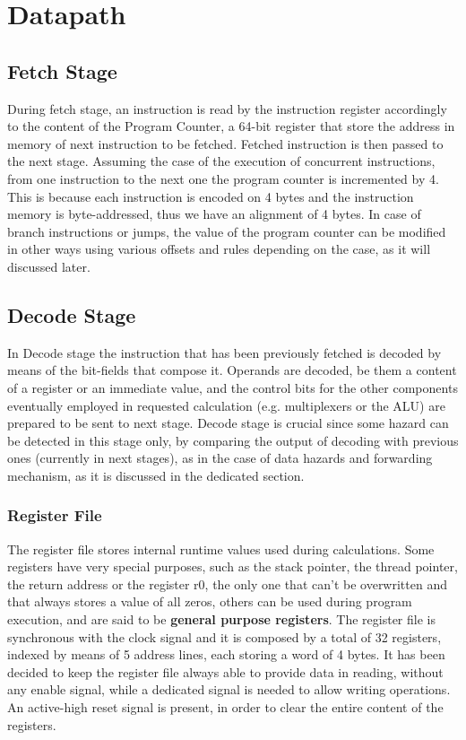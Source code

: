 %
 
\chapter{Datapath}
\label{cha2}
\section{Fetch Stage}
During fetch stage, an instruction is read by the instruction register accordingly to the content of the Program Counter, a 64-bit register that store the address in memory of next instruction to be fetched.
Fetched instruction is then passed to the next stage.
Assuming the case of the execution of concurrent instructions, from one instruction to the next one the program counter is incremented by 4. This is because each instruction is encoded on 4 bytes and the instruction memory is byte-addressed, thus we have an alignment of 4 bytes.
In case of branch instructions or jumps, the value of the program counter can be modified in other ways using various offsets and rules depending on the case, as it will discussed later.
\section{Decode Stage}
In Decode stage the instruction that has been previously fetched is decoded by means of the bit-fields that compose it.
Operands are decoded, be them a content of a register or an immediate value, and the control bits for the other components eventually employed in requested calculation (e.g. multiplexers or the ALU) are prepared to be sent to next stage.
Decode stage is crucial since some hazard can be detected in this stage only, by comparing the output of decoding with previous ones (currently in next stages), as in the case of data hazards and forwarding mechanism, as it is discussed in the dedicated section.
\subsection{Register File}
The register file stores internal runtime values used during calculations.
Some registers have very special purposes, such as the stack pointer, the thread pointer, the return address or the register r0, the only one that can't be overwritten and that always stores a value of all zeros, others can be used during program execution, and are said to be \textbf{general purpose registers}.
The register file is synchronous with the clock signal and it is composed by a total of 32 registers, indexed by means of 5 address lines, each storing a word of 4 bytes.
It has been decided to keep the register file always able to provide data in reading, without any enable signal, while a dedicated signal is needed to allow writing operations.
An active-high reset signal is present, in order to clear the entire content of the registers.

